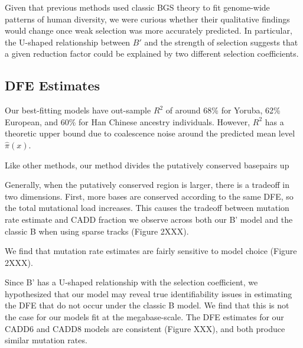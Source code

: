 \documentclass[11pt]{article}
\begin{document}
Given that previous methods used classic BGS theory to fit genome-wide patterns
of human diversity, we were curious whether their qualitative findings would
change once weak selection was more accurately predicted. In particular, the
U-shaped relationship between $B'$ and the strength of selection suggests that
a given reduction factor could be explained by two different selection
coefficients.

\subsection*{DFE Estimates}

Our best-fitting models have out-sample $R^2$ of around 68\% for Yoruba, 62\%
European, and 60\% for Han Chinese ancestry individuals. However, $R^2$ has a
theoretic upper bound due to coalescence noise around the predicted mean level
$\widehat{\pi}(x)$.




Like other methods, our method divides the putatively conserved basepairs up

Generally, when the putatively conserved region is larger, there is a tradeoff
in two dimensions. First, more bases are conserved according to the same DFE,
so the total mutational load increases. This causes the tradeoff between
mutation rate estimate and CADD fraction we observe across both our B' model
and the classic B when using sparse tracks (Figure 2XXX). 


We find that mutation rate estimates are fairly sensitive to model choice
(Figure 2XXX). 

Since B' has a U-shaped relationship with the selection coefficient, we
hypothesized that our model may reveal true identifiability issues in
estimating the DFE that do not occur under the classic B model. We find that
this is not the case for our models fit at the megabase-scale. The DFE
estimates for our CADD6 and CADD8 models are consistent (Figure XXX), and both
produce similar mutation rates.
\end{document}
